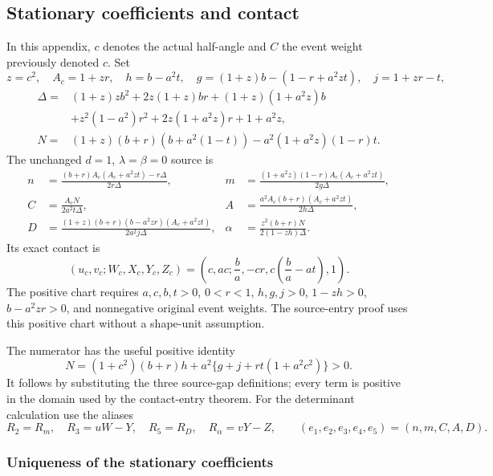 \subsection{Stationary coefficients and contact}\label{component:p6e5d41ed80b3}\label{app:c2-source}
In this appendix, $c$ denotes the actual half-angle and
$C$ the event weight previously denoted $c$. Set
\[
 z=c^2,\quad A_c=1+zr,\quad
 h=b-a^2t,\quad g=(1+z)b-(1-r+a^2zt),\quad j=1+zr-t,
\]
\begin{align*}
\Delta={}&(1+z)zb^2+2z(1+z)br+(1+z)(1+a^2z)b\\
 &+z^2(1-a^2)r^2+2z(1+a^2z)r+1+a^2z,\\
N={}&(1+z)(b+r)(b+a^2(1-t))-a^2(1+a^2z)(1-r)t.
\end{align*}
The unchanged $d=1$, $\lambda=\beta=0$ source is
\begin{equation}\begin{aligned}
n&=\frac{(b+r)A_c(A_c+a^2zt)-r\Delta}{2r\Delta},&
m&=\frac{(1+a^2z)(1-r)A_c(A_c+a^2zt)}{2g\Delta},\\
C&=\frac{A_cN}{2a^2t\Delta},&
A&=\frac{a^2A_c(b+r)(A_c+a^2zt)}{2h\Delta},\\
D&=\frac{(1+z)(b+r)(b-a^2zr)(A_c+a^2zt)}{2a^2j\Delta},&
\alpha&=\frac{z^2(b+r)N}{2(1-zh)\Delta}.
\end{aligned}\label{eq:c2-native-source}\end{equation}
Its exact contact is
\begin{equation}
 (u_c,v_c;W_c,X_c,Y_c,Z_c)
   =\left(c,ac;\frac ba,-cr,c\left(\frac ba-at\right),1\right).
\label{eq:c2-native-contact}\end{equation}
The positive chart requires $a,c,b,t>0$, $0<r<1$, $h,g,j>0$,
$1-zh>0$, $b-a^2zr>0$, and nonnegative original event weights.
The source-entry proof uses this positive chart without a shape-unit
assumption.

The numerator has the useful positive identity
\[
N=(1+c^2)(b+r)h+a^2\{g+j+rt(1+a^2c^2)\}>0.
\]
It follows by substituting the three source-gap definitions; every term
is positive in the domain used by the contact-entry theorem.
For the determinant calculation use the aliases
\[
 R_2=R_m,\quad R_3=uW-Y,\quad R_5=R_D,\quad R_\alpha=vY-Z,
 \qquad(e_1,e_2,e_3,e_4,e_5)=(n,m,C,A,D).
\]

\subsubsection{Uniqueness of the stationary coefficients}\label{component:p61209c7390b0}
\label{sec:c2-contact-determinant}

